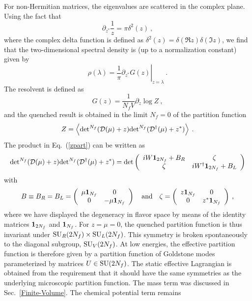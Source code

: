 For non-Hermitian matrices, the eigenvalues are scattered in the
complex plane.  Using the fact that
\begin{equation}
  \partial_{z^*} \frac 1z = \pi \delta^2(z) \:,
\end{equation}
where the complex delta function is defined as $\delta^2(z) =
\delta(\Re z)\delta(\Im z)$, we find that the two-dimensional spectral
density is (up to a normalization constant) given by
\begin{equation}
  \rho(\lambda) = \left .\frac 1\pi \partial_{z^*} G(z)\right
  |_{z=\lambda} \:. 
  \label{BCC}
\end{equation}
The resolvent is defined as
\begin{equation}
  G(z) = \frac 1{N_f V} \partial_{z} \log Z\:,
  \label{Gz}
\end{equation}
and the quenched result is obtained in the limit $N_f = 0$ of the
partition function
\begin{equation}
  Z=\left\langle {\det}^{N_f}({\cal D}(\mu)+z) {\det}^{N_f}
  ({\cal D}^\dagger(\mu) + z^*)\right\rangle \:.
  \label{zpart}
\end{equation}
The product in Eq.~(\ref{zpart}) can be written as
\begin{equation}
  {\det}^{N_f}({\cal D}(\mu)+z) {\det}^{N_f}( {\cal D}^\dagger(\mu) + z^*) = 
  \det \left ( \begin{array}{cc} iW{\bf 1}_{2N_f} +B_R& \zeta \\ \zeta & iW^\dagger {\bf 1}_{2N_f}
    +B_L \end{array} \right )
\end{equation}
with
\begin{equation}
  B\equiv B_R=B_L = \left ( \begin{array}{cc} \mu{\bf 1}_{N_f} & 0 \\ 0 & -\mu{\bf 1}_{N_f} 
\end{array} \right ) \quad {\rm and} \quad
  \zeta = \left ( \begin{array}{cc} z{\bf 1}_{N_f} & 0 \\ 0 & z^*{\bf 1}_{N_f} \end{array} \right )\:,
\end{equation}
where we have displayed the degeneracy in flavor space by means of the
identity matrices ${\bf 1}_{2N_f}$ and ${\bf 1}_{N_f}$.  For $z=\mu
=0$, the quenched partition function is thus invariant under ${\rm
  SU}_R(2N_f)\times {\rm SU}_L(2N_f)$. This symmetry is broken
spontaneously to the diagonal subgroup, ${\rm SU}_V(2N_f)$.  At low
energies, the effective partition function is therefore given by a
partition function of Goldstone modes parameterized by matrices
$U\in{\rm SU}(2N_f)$. 
The static effective Lagrangian is obtained from the requirement that
it should have the same symmetries as the underlying microscopic
partition function. The mass term was discussed in
Sec.~\ref{Finite-Volume}.  The chemical potential term remains
